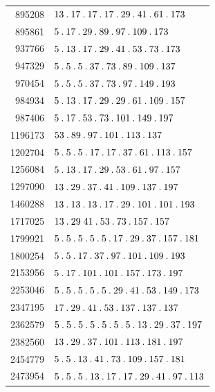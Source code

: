 %
\begingroup\small\setlength{\tabcolsep}{5pt}
\begin{longtable}{@{}r|l@{}}
895208 & $13\pdot 17\pdot 17\pdot 17\pdot 29\pdot 41\pdot 61\pdot 173$\\
895861 & $5\pdot 17\pdot 29\pdot 89\pdot 97\pdot 109\pdot 173$\\
937766 & $5\pdot 13\pdot 17\pdot 29\pdot 41\pdot 53\pdot 73\pdot 173$\\
947329 & $5\pdot 5\pdot 5\pdot 37\pdot 73\pdot 89\pdot 109\pdot 137$\\
970454 & $5\pdot 5\pdot 5\pdot 37\pdot 73\pdot 97\pdot 149\pdot 193$\\
984934 & $5\pdot 13\pdot 17\pdot 29\pdot 29\pdot 61\pdot 109\pdot 157$\\
987406 & $5\pdot 17\pdot 53\pdot 73\pdot 101\pdot 149\pdot 197$\\
1196173 & $53\pdot 89\pdot 97\pdot 101\pdot 113\pdot 137$\\
1202704 & $5\pdot 5\pdot 5\pdot 17\pdot 17\pdot 37\pdot 61\pdot 113\pdot 157$\\
1256084 & $5\pdot 13\pdot 17\pdot 29\pdot 53\pdot 61\pdot 97\pdot 157$\\
1297090 & $13\pdot 29\pdot 37\pdot 41\pdot 109\pdot 137\pdot 197$\\
1460288 & $13\pdot 13\pdot 13\pdot 17\pdot 29\pdot 101\pdot 101\pdot 193$\\
1717025 & $13\pdot 29\;41\pdot 53\pdot 73\pdot 157\pdot 157$\\
1799921 & $5\pdot 5\pdot 5\pdot 5\pdot 5\pdot 17\pdot 29\pdot 37\pdot 157\pdot 181$\\
1800254 & $5\pdot 5\pdot 17\pdot 37\pdot 97\pdot 101\pdot 109\pdot 193$\\
2153956 & $5\pdot 17\pdot 101\pdot 101\pdot 157\pdot 173\pdot 197$\\
2253046 & $5\pdot 5\pdot 5\pdot 5\pdot 5\pdot 29\pdot 41\pdot 53\pdot 149\pdot 173$\\
2347195 & $17\pdot 29\pdot 41\pdot 53\pdot 137\pdot 137\pdot 137$\\
2362579 & $5\pdot 5\pdot 5\pdot 5\pdot 5\pdot 5\pdot 5\pdot 13\pdot 29\pdot 37\pdot 197$\\
2382560 & $13\pdot 29\pdot 37\pdot 101\pdot 113\pdot 181\pdot 197$\\
2454779 & $5\pdot 5\pdot 13\pdot 41\pdot 73\pdot 109\pdot 157\pdot 181$\\
2473954 & $5\pdot 5\pdot 5\pdot 13\pdot 17\pdot 17\pdot 29\pdot 41\pdot 97\pdot 113$\\

\end{longtable}
